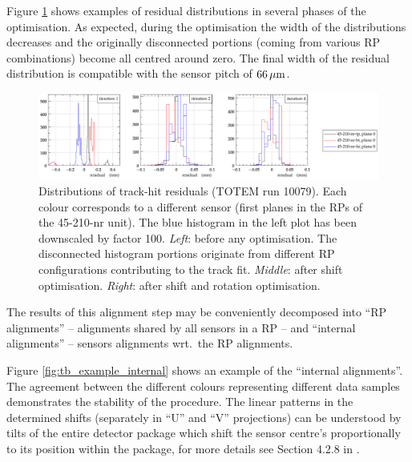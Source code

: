 \documentclass[TOTEM]{cern/cernphprep}
\def\un#1{\,{\rm #1}}
\begin{document}
Figure \ref{fig:tb_residuals} shows examples of residual distributions in several phases of the optimisation. As expected, during the optimisation the width of the distributions decreases and the originally disconnected portions (coming from various RP combinations) become all centred around zero. The final width of the residual distribution is compatible with the sensor pitch of $66\un{\mu m}$.


\begin{figure}[h!]
\begin{center}
\includegraphics[width=\hsize]{fig/calibration_fill/residuals.pdf}
\caption{%
Distributions of track-hit residuals (TOTEM run 10079). Each colour corresponds to a different sensor (first planes in the RPs of the 45-210-nr unit). The blue histogram in the left plot has been downscaled by factor 100. {\it Left}: before any optimisation. The disconnected histogram portions originate from different RP configurations contributing to the track fit. {\it Middle}: after shift optimisation. {\it Right}: after shift and rotation optimisation.
}
\label{fig:tb_residuals}
\end{center}
\end{figure}

The results of this alignment step may be conveniently decomposed into ``RP alignments'' -- alignments shared by all sensors in a RP -- and ``internal alignments'' -- sensors alignments wrt.~the RP alignments.

Figure \ref{fig:tb_example_internal} shows an example of the ``internal alignments''. The agreement between the different colours representing different data samples demonstrates the stability of the procedure. The linear patterns in the determined shifts (separately in ``U'' and ``V'' projections) can be understood by tilts of the entire detector package which shift the sensor centre's proportionally to its position within the package, for more details see Section 4.2.8 in \cite{jan_thesis}.
\end{document}
